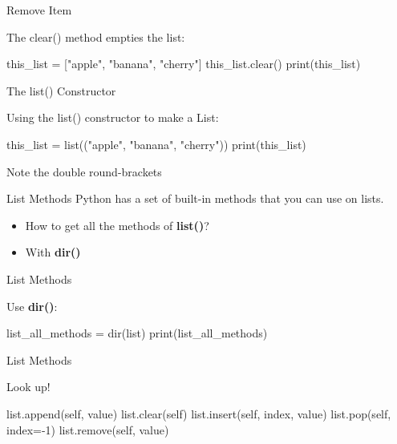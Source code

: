 \documentclass[hyperref={pdfpagelabels=false}]{beamer}
\begin{document}
\begin{frame}[fragile]{Remove Item}
\begin{exampleblock}{The {\color{red}clear()} method empties the list:}
\begin{python3}
this_list = ["apple", "banana", "cherry"]
this_list.clear()
print(this_list)
\end{python3}
\end{exampleblock}
\end{frame}

\begin{frame}[fragile]{The list() Constructor}
\begin{exampleblock}{Using the list() constructor to make a List:}
\begin{python3}
this_list = list(("apple", "banana", "cherry"))
print(this_list)
\end{python3}
\end{exampleblock}

Note the double round-brackets
\end{frame}

\begin{frame}[fragile]{List Methods}
Python has a set of built-in methods that you can use on lists.
\begin{itemize}[<+->]
\item How to get all the methods of \textbf{list()}?
\item With \textbf{dir()}
\end{itemize}

\end{frame}

\begin{frame}[fragile]{List Methods}
\begin{exampleblock}{Use \textbf{dir()}:}
\begin{python3}
list_all_methods = dir(list)
print(list_all_methods)
\end{python3}
\end{exampleblock}
\end{frame}

\begin{frame}[fragile]{List Methods}
\begin{exampleblock}{Look up!}
\begin{python3}
list.append(self, value)
list.clear(self)
list.insert(self, index, value)
list.pop(self, index=-1)
list.remove(self, value)
\end{python3}
\end{exampleblock}
\end{frame}
\end{document}
